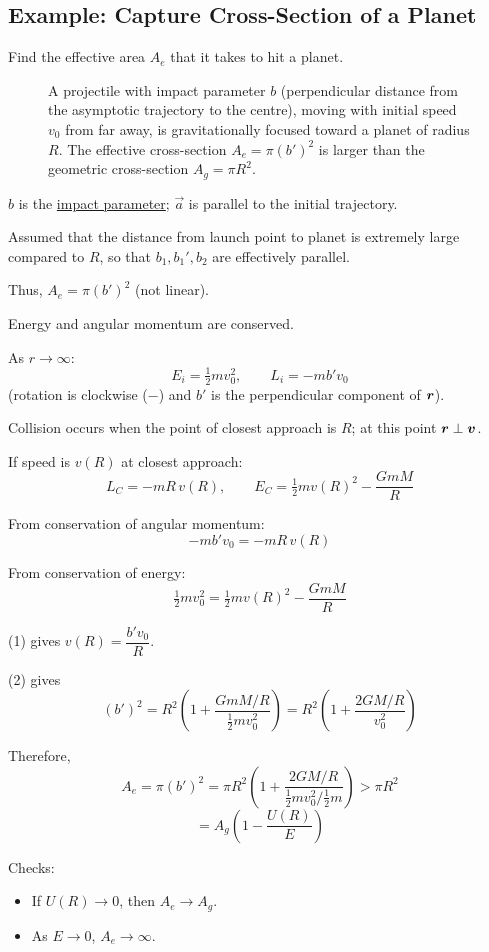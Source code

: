 \subsection{Example: Capture Cross-Section of a Planet}

\begin{example}
Find the effective area $A_e$ that it takes to hit a planet.

\begin{figure}[H]
\centering
\caption{A projectile with impact parameter $b$ (perpendicular distance from the asymptotic trajectory to the centre), moving with initial speed $v_0$ from far away, is gravitationally focused toward a planet of radius $R$. The effective cross-section $A_e = \pi(b')^2$ is larger than the geometric cross-section $A_g = \pi R^2$.}
\end{figure}

$b$ is the \underline{impact parameter}; $\vec{a}$ is parallel to the initial trajectory.

Assumed that the distance from launch point to planet is extremely large compared to $R$, so that $b_1,b_1',b_2$ are effectively parallel.

Thus, $A_e = \pi(b')^2$ (not linear).

Energy and angular momentum are conserved.

As $r\to\infty$:
\[
    E_i = \tfrac{1}{2}mv_0^2, \qquad L_i = -mb'v_0
\]
(rotation is clockwise ($-$) and $b'$ is the perpendicular component of $\bm{r}$).

Collision occurs when the point of closest approach is $R$; at this point $\bm{r}\perp\bm{v}$.

If speed is $v(R)$ at closest approach:
\[
    L_C = -mR\,v(R), \qquad E_C = \tfrac{1}{2}mv(R)^2 - \frac{GmM}{R}
\]

From conservation of angular momentum:
\[
    -mb'v_0 = -mR\,v(R) \tag{1}
\]

From conservation of energy:
\[
    \tfrac{1}{2}mv_0^2 = \tfrac{1}{2}mv(R)^2 - \frac{GmM}{R} \tag{2}
\]

(1) gives $v(R) = \dfrac{b'v_0}{R}$.

(2) gives
\[
    (b')^2 = R^2\!\left(1+\frac{GmM/R}{\frac{1}{2}mv_0^2}\right)
    = R^2\!\left(1+\frac{2GM/R}{v_0^2}\right)
\]

Therefore,
\[
    A_e = \pi(b')^2 = \pi R^2\!\left(1+\frac{2GM/R}{\frac{1}{2}mv_0^2/\frac{1}{2}m}\right)
    > \pi R^2
\]
\[
    = A_g\!\left(1 - \frac{U(R)}{E}\right)
\]

Checks:
\begin{itemize}
    \item If $U(R)\to 0$, then $A_e \to A_g$. \checkmark
    \item As $E\to 0$, $A_e\to\infty$. \checkmark
\end{itemize}
\end{example}


